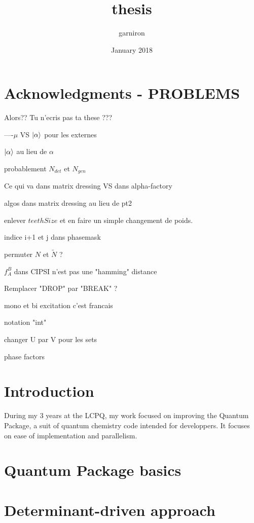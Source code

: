 \documentclass[12pt,a4paper]{report}
\title{thesis}
\author{garniron}
\date{January 2018}
\begin{document}
\dominitoc

\maketitle
\newpage

\chapter*{Acknowledgments - PROBLEMS}



Alors?? Tu n'ecris pas ta these ???


----$\mu$ VS $\ket \alpha$ pour les externes

$\ket \alpha$ au lieu de $\alpha$

probablement $N_{det}$ et $N_{gen}$

Ce qui va dans matrix dressing VS dans alpha-factory

algos dans matrix dressing au lieu de pt2

enlever $teethSize$ et en faire un simple changement de poids.

indice i+1 et j dans phasemask

permuter $N$ et $\tilde N$ ?

$f_A^B$ dans CIPSI n'est pas une "hamming" distance

Remplacer "DROP" par "BREAK" ?

mono et bi excitation c'est francais

notation "int"

changer U par V pour les sets

phase factors

\newpage

\tableofcontents
\newpage


\chapter{Introduction}

During my 3 years at the LCPQ, my work focused on improving the Quantum Package, a suit of quantum chemistry code intended for developpers. It focuses on ease of implementation and parallelism.

\chapter{Quantum Package basics}
\minitoc



\chapter{Determinant-driven approach}
\minitoc

\end{document}
